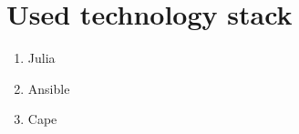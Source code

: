 \chapter{Used technology stack}
\begin{enumerate}
    \item Julia
    \item Ansible
    \item Cape
\end{enumerate}
